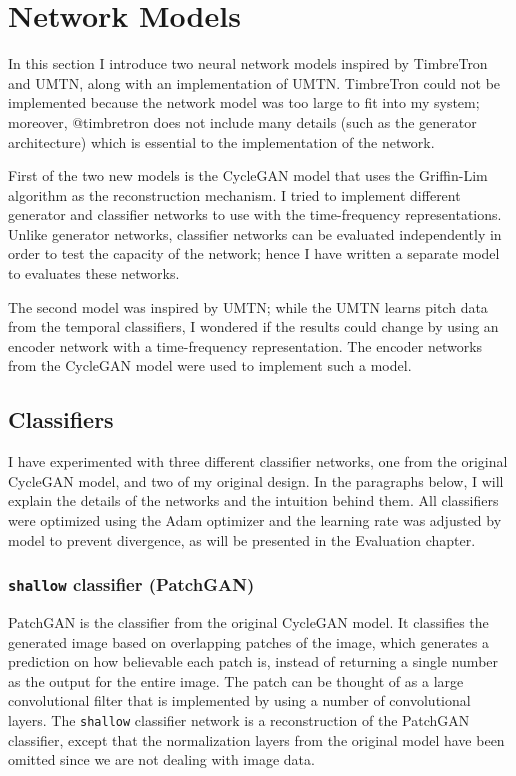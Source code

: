 \documentclass[]{report}
\begin{document}
\hypertarget{network-models}{%
\section{Network Models}\label{network-models}}

In this section I introduce two neural network models inspired by
TimbreTron and UMTN, along with an implementation of UMTN. TimbreTron
could not be implemented because the network model was too large to fit
into my system; moreover, @timbretron does not include many details
(such as the generator architecture) which is essential to the
implementation of the network.

First of the two new models is the CycleGAN model that uses the
Griffin-Lim algorithm as the reconstruction mechanism. I tried to
implement different generator and classifier networks to use with the
time-frequency representations. Unlike generator networks, classifier
networks can be evaluated independently in order to test the capacity of
the network; hence I have written a separate model to evaluates these
networks.

The second model was inspired by UMTN; while the UMTN learns pitch data
from the temporal classifiers, I wondered if the results could change by
using an encoder network with a time-frequency representation. The
encoder networks from the CycleGAN model were used to implement such a
model.

\hypertarget{classifiers}{%
\subsection{Classifiers}\label{classifiers}}

I have experimented with three different classifier networks, one from
the original CycleGAN model, and two of my original design. In the
paragraphs below, I will explain the details of the networks and the
intuition behind them. All classifiers were optimized using the Adam
optimizer and the learning rate was adjusted by model to prevent
divergence, as will be presented in the Evaluation chapter.

\hypertarget{shallow-classifier-patchgan}{%
\subsubsection{\texorpdfstring{\texttt{shallow} classifier
(PatchGAN)}{shallow classifier (PatchGAN)}}\label{shallow-classifier-patchgan}}

PatchGAN is the classifier from the original CycleGAN model. It
classifies the generated image based on overlapping patches of the
image, which generates a prediction on how believable each patch is,
instead of returning a single number as the output for the entire image.
The patch can be thought of as a large convolutional filter that is
implemented by using a number of convolutional layers. The
\texttt{shallow} classifier network is a reconstruction of the PatchGAN
classifier, except that the normalization layers from the original model
have been omitted since we are not dealing with image data.
\end{document}
